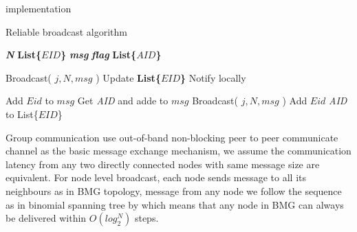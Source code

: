 \documentclass[sigconf]{acmart}
\begin{document}
\begin{algorithm}implementation
\caption{Reliable broadcast algorithm }
\textbf{\textit{N}} \newline
\textbf{List\{$EID$\}} \newline
\textbf{\textit{msg}} \newline
\textbf{\textit{flag}} \newline
\textbf{List\{$AID$\}} \newline

\begin{algorithmic}[1]
\EndFor
\EndProcedure
\end{algorithmic}

\begin{algorithmic}[1]
    \State Broadcast( $j, N, msg$ )
    \State Update \textbf{List\{$EID$\}}
    \State Notify locally
\EndIf
\EndProcedure
\end{algorithmic}

\begin{algorithmic}[1]
    \State Add $Eid$ to $msg$
    \State Get \textit{AID} and adde to $msg$
    \State Broadcast( $j, N, msg$ )
    \State Add $Eid$ \textit{AID} to List\{$EID$\}
\EndIf
\EndProcedure
\end{algorithmic}

\end{algorithm}

Group communication use out-of-band non-blocking peer to peer communicate channel as the basic message exchange mechanism, we assume the communication latency from any two directly connected nodes with same message size are equivalent. For node level broadcast, each node sends message to all its neighbours  as in BMG topology, message from any node we follow the sequence as in binomial spanning tree by which means that any node in BMG can always be delivered within $O(log_2^N)$ steps.
\end{document}
